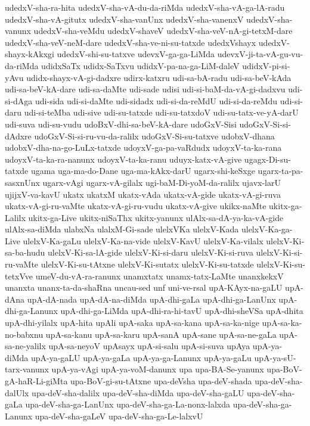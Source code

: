 {udedxV-sha-ra-hita
udedxV-sha-vA-du-da-riMda
udedxV-sha-vA-ga-lA-radu
udedxV-sha-vA-gitutx
udedxV-sha-vanUnx
udedxV-sha-vanenxV
udedxV-sha-vanunx
udedxV-sha-veMdu
udedxV-shaveV
udedxV-sha-veV-nA-gi-tetxM-dare
udedxV-sha-veV-neM-dare
udedxV-sha-ve-ni-su-tatxde
udedxVshayx
udedxV-shayx-kAkxgi
udedxV-shi-su-tatxve
udevxV-ga-ga-LiMda
udevxV-ji-ta-vA-gu-vu-da-riMda
udidxSaTx
udidx-SaTxvu
udidxV-pa-na-ga-LiM-daleV
udidxV-pi-si-yAvu
udidx-shayx-vA-gi-dadxre
udirx-katxru
udi-sa-bA-radu
udi-sa-beV-kAda
udi-sa-beV-kA-dare
udi-sa-daMte
udi-sade
udisi
udi-si-baM-da-vA-gi-dadxvu
udi-si-dAga
udi-sida
udi-si-daMte
udi-sidadx
udi-si-da-reMdU
udi-si-da-reMdu
udi-si-daru
udi-si-teMba
udi-sive
udi-su-tatxde
udi-su-tatxdoV
udi-su-tatx-ve-yA-darU
udi-suva
udi-su-vudu
udoBxV-dhi-sa-beV-kA-dare
udoGxV-Sisi
udoGxV-Si-si-dAdxre
udoGxV-Si-si-ru-vu-da-ralilx
udoGxV-Si-su-tatxve
udobxV-dhana
udobxV-dha-na-go-LuLx-tatxde
udoyxV-ga-pa-vaRdudx
udoyxV-ta-ka-rana
udoyxV-ta-ka-ra-nanunx
udoyxV-ta-ka-ranu
uduyx-katx-vA-give
ugagx-Di-su-tatxde
ugama
uga-ma-do-Dane
uga-ma-kAkx-darU
ugarx-shi-keSxge
ugarx-ta-pa-sasxnUnx
ugarx-vAgi
ugarx-vA-gilalx
ugi-baM-Di-yoM-da-ralilx
ujavx-larU
ujijxV-va-kavU
ukatx
ukatxM
ukatx-vAda
ukatx-vA-gide
ukatx-vA-gi-ruva
ukatx-vA-gi-ru-vaMte
ukatx-vA-gi-ru-vudu
ukatx-vA-give
ukikx-naMte
ukitx-ga-Lalilx
ukitx-ga-Live
ukitx-niSaThx
ukitx-yanunx
ulAlx-sa-dA-ya-ka-vA-gide
ulAlx-sa-diMda
ulabxNa
ulalxM-Gi-sade
ulelxVKa
ulelxV-Kada
ulelxV-Ka-ga-Live
ulelxV-Ka-gaLu
ulelxV-Ka-na-vide
ulelxV-KavU
ulelxV-Ka-vilalx
ulelxV-Ki-sa-ba-hudu
ulelxV-Ki-sa-lA-gide
ulelxV-Ki-si-daru
ulelxV-Ki-si-ruva
ulelxV-Ki-si-ru-vaMte
ulelxV-Ki-su-tAtxne
ulelxV-Ki-sutatx
ulelxV-Ki-su-tatxde
ulelxV-Ki-su-tetxVve
umeV-du-vA-ra-ranunx
unamxtatx
unamx-tatx-LaMte
unanxkekxV
unanxta
unanx-ta-da-shaRna
uncau-sed
unf
uni-ve-rsal
upA-KAyx-na-gaLU
upA-dAna
upA-dA-nada
upA-dA-na-diMda
upA-dhi-gaLa
upA-dhi-ga-LanUnx
upA-dhi-ga-Lanunx
upA-dhi-ga-LiMda
upA-dhi-ra-hi-tavU
upA-dhi-sheVSa
upA-dhita
upA-dhi-yilalx
upA-hita
upAli
upA-saka
upA-sa-kana
upA-sa-ka-nige
upA-sa-ka-no-babxnu
upA-sa-kanu
upA-sa-karu
upA-sanA
upA-sane
upA-sa-ne-gaLa
upA-sa-ne-yalilx
upA-sa-neyoV
upAsayx
upA-si-salu
upA-si-suva
upAya
upA-ya-diMda
upA-ya-gaLU
upA-ya-gaLa
upA-ya-ga-Lanunx
upA-ya-gaLu
upA-ya-sU-tarx-vanunx
upA-ya-vAgi
upA-ya-voM-danunx
upa
upa-BA-Se-yanunx
upa-BoV-gA-haR-Li-giMta
upa-BoV-gi-su-tAtxne
upa-deVsha
upa-deV-shada
upa-deV-sha-dalUlx
upa-deV-sha-dalilx
upa-deV-sha-diMda
upa-deV-sha-gaLU
upa-deV-sha-gaLa
upa-deV-sha-ga-LanUnx
upa-deV-sha-ga-La-nonx-lalxda
upa-deV-sha-ga-Lanunx
upa-deV-sha-gaLeV
upa-deV-sha-ga-Le-lalxvU
}
